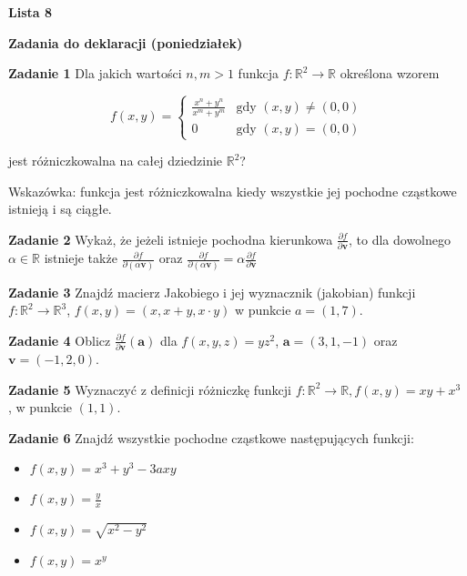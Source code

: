 \documentclass[a4paper,11pt]{article}
\begin{document}
\begin{center}
  {\large\textbf{Lista 8}}
\end{center}

\hrulefill
\begin{center}
    \textbf{Zadania do deklaracji (poniedziałek)}
\end{center}

\bigskip

\textbf{Zadanie 1} Dla jakich wartości $n,m > 1$ funkcja  $f:
\mathbb{R}^2 \to \mathbb{R}$ określona wzorem 

\[
    f(x,y) = 
    \begin{cases}
        \frac{x^n + y^n}{x^m + y^m} & \text{gdy~} (x,y)  \neq  (0,0) \\
        0 & \text{gdy~} (x,y) = (0,0)
    \end{cases}
\] 

jest różniczkowalna na całej dziedzinie $\mathbb{R}^2$?

Wskazówka: funkcja jest różniczkowalna kiedy wszystkie jej pochodne
cząstkowe istnieją i są ciągłe.

\bigskip

\textbf{Zadanie 2} Wykaż, że jeżeli istnieje pochodna kierunkowa
$\frac{\partial f}{\partial \bm{v}}$, to dla dowolnego $\alpha \in
\mathbb{R}$ istnieje także  $\frac{\partial f}{\partial (\alpha \bm{v})}$
oraz  $\frac{\partial f}{\partial (\alpha \bm{v})} = \alpha \frac{\partial
f}{\partial \bm{v}}$

\bigskip

\textbf{Zadanie 3} Znajdź macierz Jakobiego i jej wyznacznik (jakobian)
funkcji $f: \mathbb{R}^2 \to \mathbb{R}^3$, $f(x,y) = (x, x+y, x \cdot
y)$ w punkcie $a=(1,7)$.

\bigskip

\textbf{Zadanie 4} Oblicz $\frac{\partial f}{\partial \bm{v}}(\bm{a})$
dla $f(x,y,z) = y z^2$, $\bm{a} = (3,1,-1)$ oraz  $\bm{v} = (-1,2,0)$.

\bigskip

\hrulefill

\bigskip

\textbf{Zadanie 5} Wyznaczyć z definicji różniczkę funkcji $f :
\mathbb{R}^2 \to \mathbb{R}, f(x, y) = xy + x^3$ , w punkcie $(1, 1)$.

\bigskip

\textbf{Zadanie 6} Znajdź wszystkie pochodne cząstkowe następujących
funkcji:

\begin{multicols}{2}
    \begin{itemize}
        \item $f(x,y) = x^3 + y^3 - 3axy$ 
        \item $f(x,y) = \frac{y}{x}$ 
        \item $f(x,y) = \sqrt{x^2 - y^2} $ 
        \item $f(x,y) = x^y$
    \end{itemize}
\end{multicols}
\end{document}

